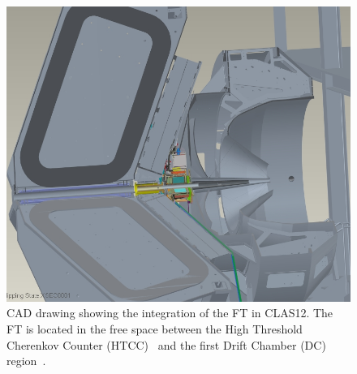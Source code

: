 \begin{figure}[th!]
\centering 
\includegraphics[width=\columnwidth]{./fig/ft_cad.jpg} 
\caption{CAD drawing showing the integration of the FT in CLAS12. The FT is located in the free space between
  the High Threshold Cherenkov Counter (HTCC)~\cite{htcc} and the first Drift Chamber (DC) region~\cite{dc}.} 
\label{fig:ftinclas12} 
\end{figure}
